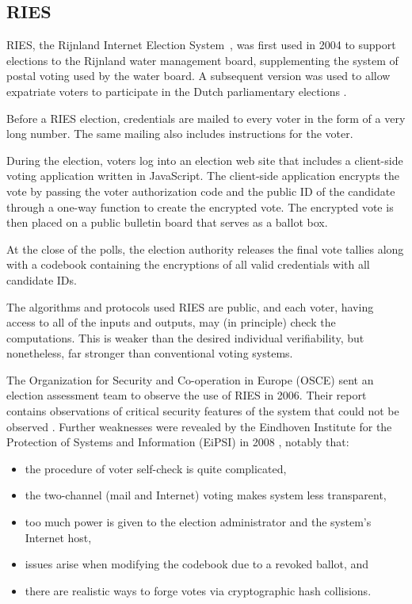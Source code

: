 \subsection{RIES}
\label{sec:ries} 

RIES, the Rijnland Internet Election System~\cite{hubbers2004}, was
first used in 2004 to support elections to the Rijnland water
management board, supplementing the system of postal voting used by
the water board. A subsequent version was used to allow expatriate
voters to participate in the Dutch parliamentary elections
\cite{gonggrijp2009}.

Before a RIES election, credentials are mailed to every voter in the
form of a very long number. The same mailing also includes
instructions for the voter.

During the election, voters log into an election web site that
includes a client-side voting application written in JavaScript. The
client-side application encrypts the vote by passing the voter
authorization code and the public ID of the candidate through a
one-way function to create the encrypted vote. The encrypted vote is
then placed on a public bulletin board that serves as a ballot box.

At the close of the polls, the election authority releases the final
vote tallies along with a codebook containing the encryptions of all
valid credentials with all candidate IDs.

The algorithms and protocols used RIES are public, and each voter,
having access to all of the inputs and outputs, may (in principle)
check the computations. This is weaker than the desired individual
verifiability, but nonetheless, far stronger than conventional voting
systems.

The Organization for Security and Co-operation in Europe (OSCE) sent
an election assessment team to observe the use of RIES in 2006. Their
report contains observations of critical security features of the
system that could not be observed \cite{osce2007}. Further
weaknesses were revealed by the Eindhoven Institute for the Protection
of Systems and Information (EiPSI) in 2008 \cite{hubbers2008},
notably that:

\begin{itemize}
  \item the procedure of voter self-check is quite complicated,
  \item the two-channel (mail and Internet) voting makes system less
    transparent,
  \item too much power is given to the election administrator and the
    system's Internet host,
  \item issues arise when modifying the codebook due to a revoked
    ballot, and
  \item there are realistic ways to forge votes via cryptographic hash
    collisions.
\end{itemize}

